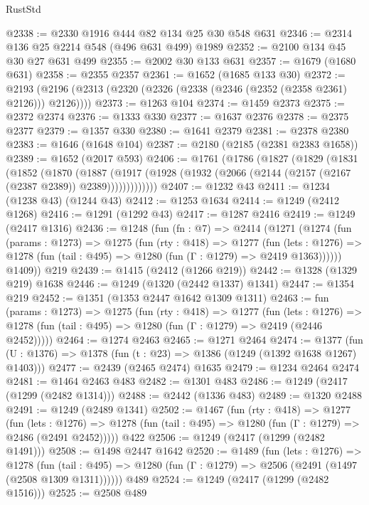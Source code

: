\begin{lexlean}{RustStd}
\begin{coremodule}
@2338 := @2330 @1916 @444 @82 @134 @25 @30 @548 @631
@2346 := @2314 @136 @25 @2214 @548 (@496 @631 @499) @1989
@2352 := @2100 @134 @45 @30 @27 @631 @499
@2355 := @2002 @30 @133 @631
@2357 := @1679 (@1680 @631)
@2358 := @2355 @2357
@2361 := @1652 (@1685 @133 @30)
@2372 := @2193 (@2196 (@2313 (@2320 (@2326 (@2338 (@2346 (@2352 (@2358 @2361) @2126))) @2126))))
@2373 := @1263 @104
@2374 := @1459 @2373
@2375 := @2372 @2374
@2376 := @1333 @330
@2377 := @1637 @2376
@2378 := @2375 @2377
@2379 := @1357 @330
@2380 := @1641 @2379
@2381 := @2378 @2380
@2383 := @1646 (@1648 @104)
@2387 := @2180 (@2185 (@2381 @2383 @1658))
@2389 := @1652 (@2017 @593)
@2406 := @1761
    (@1786
      (@1827
        (@1829
          (@1831
            (@1852
              (@1870
                (@1887
                  (@1917 (@1928 (@1932 (@2066 (@2144 (@2157 (@2167 (@2387 @2389)) @2389)))))))))))))
@2407 := @1232 @43
@2411 := @1234 (@1238 @43) (@1244 @43)
@2412 := @1253 @1634
@2414 := @1249 (@2412 @1268)
@2416 := @1291 (@1292 @43)
@2417 := @1287 @2416
@2419 := @1249 (@2417 @1316)
@2436 := @1248
    (fun (fn : @7) =>
    @2414
      (@1271
        (@1274
          (fun (params : @1273) =>
          @1275
            (fun (rty : @418) =>
            @1277
              (fun (lets : @1276) =>
              @1278 (fun (tail : @495) => @1280 (fun (Γ : @1279) => @2419 @1363))))))
        @1409))
    @219
@2439 := @1415 (@2412 (@1266 @219))
@2442 := @1328 (@1329 @219) @1638
@2446 := @1249 (@1320 (@2442 @1337) @1341)
@2447 := @1354 @219
@2452 := @1351 (@1353 @2447 @1642 @1309 @1311)
@2463 := fun (params : @1273) =>
  @1275
    (fun (rty : @418) =>
    @1277
      (fun (lets : @1276) =>
      @1278 (fun (tail : @495) => @1280 (fun (Γ : @1279) => @2419 (@2446 @2452)))))
@2464 := @1274 @2463
@2465 := @1271 @2464
@2474 := @1377 (fun (U : @1376) => @1378 (fun (t : @23) => @1386 (@1249 (@1392 @1638 @1267) @1403)))
@2477 := @2439 (@2465 @2474) @1635
@2479 := @1234 @2464 @2474
@2481 := @1464 @2463 @483
@2482 := @1301 @483
@2486 := @1249 (@2417 (@1299 (@2482 @1314)))
@2488 := @2442 (@1336 @483)
@2489 := @1320 @2488
@2491 := @1249 (@2489 @1341)
@2502 := @1467
    (fun (rty : @418) =>
    @1277
      (fun (lets : @1276) =>
      @1278 (fun (tail : @495) => @1280 (fun (Γ : @1279) => @2486 (@2491 @2452)))))
    @422
@2506 := @1249 (@2417 (@1299 (@2482 @1491)))
@2508 := @1498 @2447 @1642
@2520 := @1489
    (fun (lets : @1276) =>
    @1278
      (fun (tail : @495) => @1280 (fun (Γ : @1279) => @2506 (@2491 (@1497 (@2508 @1309 @1311))))))
    @489
@2524 := @1249 (@2417 (@1299 (@2482 @1516)))
@2525 := @2508 @489

\end{coremodule}
\end{lexlean}
